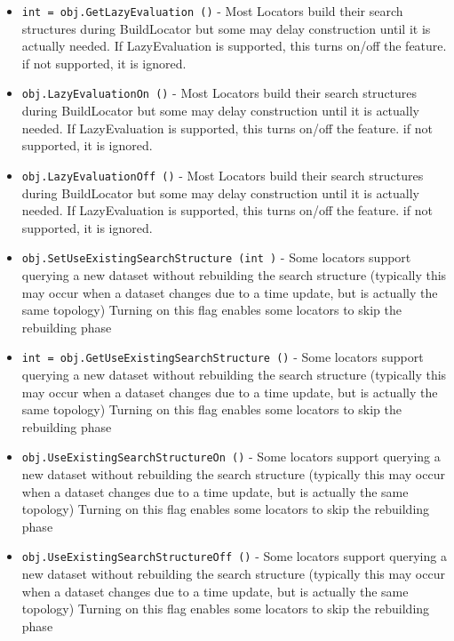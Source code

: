 \begin{itemize}
\item  \verb|int = obj.GetLazyEvaluation ()| -  Most Locators build their search structures during BuildLocator
 but some may delay construction until it is actually needed.
 If LazyEvaluation is supported, this turns on/off the feature.
 if not supported, it is ignored.

\item  \verb|obj.LazyEvaluationOn ()| -  Most Locators build their search structures during BuildLocator
 but some may delay construction until it is actually needed.
 If LazyEvaluation is supported, this turns on/off the feature.
 if not supported, it is ignored.

\item  \verb|obj.LazyEvaluationOff ()| -  Most Locators build their search structures during BuildLocator
 but some may delay construction until it is actually needed.
 If LazyEvaluation is supported, this turns on/off the feature.
 if not supported, it is ignored.

\item  \verb|obj.SetUseExistingSearchStructure (int )| -  Some locators support querying a new dataset without rebuilding
 the search structure (typically this may occur when a dataset
 changes due to a time update, but is actually the same topology)
 Turning on this flag enables some locators to skip the rebuilding 
 phase

\item  \verb|int = obj.GetUseExistingSearchStructure ()| -  Some locators support querying a new dataset without rebuilding
 the search structure (typically this may occur when a dataset
 changes due to a time update, but is actually the same topology)
 Turning on this flag enables some locators to skip the rebuilding 
 phase

\item  \verb|obj.UseExistingSearchStructureOn ()| -  Some locators support querying a new dataset without rebuilding
 the search structure (typically this may occur when a dataset
 changes due to a time update, but is actually the same topology)
 Turning on this flag enables some locators to skip the rebuilding 
 phase

\item  \verb|obj.UseExistingSearchStructureOff ()| -  Some locators support querying a new dataset without rebuilding
 the search structure (typically this may occur when a dataset
 changes due to a time update, but is actually the same topology)
 Turning on this flag enables some locators to skip the rebuilding 
 phase


\end{itemize}

